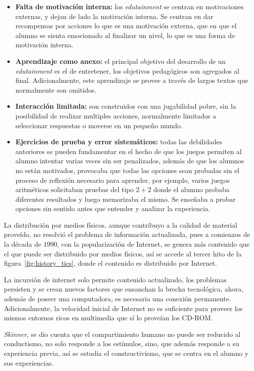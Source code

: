 \begin{itemize}

\item \textbf{Falta de motivación interna:} los \emph{edutainment} se centran en
    motivaciones externas, y dejan de lado la motivación interna. Se centran en
    dar recompensas por acciones lo que es una motivación externa, que en que el
    alumno se sienta emocionado al finalizar un nivel, lo que es una forma de
    motivación interna.

\item \textbf{Aprendizaje como anexo:} el principal objetivo del desarrollo de un
    \emph{edutainment} es el de entretener, los objetivos pedagógicos son
    agregados al final. Adicionalmente, este aprendizaje se provee a través de
    largos textos que normalmente son omitidos.

\item \textbf{Interacción limitada:} son construidos con una jugabilidad pobre,
    sin la posibilidad de realizar multiples acciones, normalmente limitados a
    seleccionar respuestas o moverse en un pequeño mundo. 

\item \textbf{Ejercicios de prueba y error sistemáticos:} todas las debilidades
    anteriores se pueden fundamentar en el hecho de que los juegos permiten al
    alumno intentar varias veces sin ser penalizados, además
    de que los alumnos no están motivados, provocaba que todas las opciones sean
    probadas sin el proceso de reflexión necesario para aprender, por ejemplo,
    varios juegos aritméticos solicitaban pruebas del tipo $2+2$ donde el alumno
    probaba diferentes resultados y luego memorizaba el mismo. Se enseñaba a
    probar opciones sin sentido antes que entender y analizar la experiencia.

\end{itemize}

La distribución por medios físicos, aunque contribuyo a la calidad de material
proveído, no resolvió el problema de información actualizada, pues a comienzos
de la década de $1990$, con la popularización de Internet, se genera más
contenido que el que puede ser distribuido por medios físicos, así se accede al
tercer hito de la figura~\ref{fig:history_tics}, donde el contenido es
distribuido por Internet.

La incursión de internet solo permite contenido actualizado, los problemas
persisten y se crean nuevos factores que ensanchan la brecha tecnológica,
ahora, además de poseer una computadora, es necesaria una conexión permanente.
Adicionalmente, la velocidad inicial de Internet no es suficiente para proveer
los mismos entornos ricos en multimedia que sí lo proveían los
CD-ROM\cite{leinonen:ict}.

\textit{Skinner}, se dio cuenta que el compartimiento humano no puede ser
reducido al conductismo, no solo responde a los estímulos, sino, que además
responde a su experiencia previa\cite{weegar2012comparison}, así se estudia el
constructivismo, que se centra en el alumno y sus experiencias.

